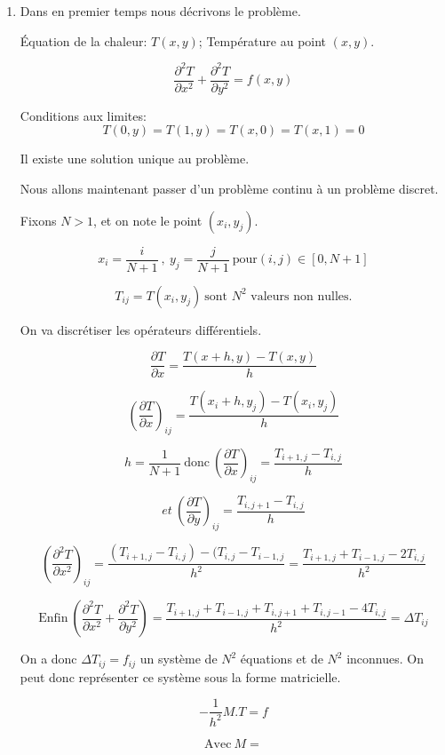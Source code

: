 \documentclass{article}
\begin{document}
\begin{enumerate}
\item Dans en premier temps nous décrivons le problème.

Équation de la chaleur: $T(x,y)$; Température au point $(x,y)$.

\[\frac{\partial^2T}{\partial x^2} + \frac{\partial^2T}{\partial y^2} = f(x,y)\]

Conditions aux limites:
\[T(0,y) = T(1,y) = T(x,0) = T(x,1) = 0\]

Il existe une solution unique au problème.

Nous allons maintenant passer d'un problème continu à un problème discret.

Fixons $N>1$, et on note le point $(x_i,y_j)$.

\[x_i = \frac{i}{N+1}\ ,\ y_j = \frac{j}{N+1}\ \text{pour} (i,j) \in [0,N+1]\]

\[T_{ij} = T(x_i,y_j)\ \text{sont $N^2$ valeurs non nulles.}\]

On va discrétiser les opérateurs différentiels.

\[\frac{\partial T}{\partial x} = \frac{T(x+h,y) - T(x,y)}{h}\]

\[\left(\frac{\partial T}{\partial x}\right)_{ij} = \frac{T(x_i+h,y_j) - T(x_i,y_j)}{h}\]

\[h = \frac{1}{N+1}\ \text{donc}\ \left(\frac{\partial T}{\partial x}\right)_{ij} = \frac{T_{i+1,j} - T_{i,j}}{h}\]

\[et\ \left(\frac{\partial T}{\partial y}\right)_{ij} = \frac{T_{i,j+1} - T_{i,j}}{h}\]

\[\left(\frac{\partial ^2T}{\partial x^2}\right)_{ij} = \frac{(T_{i+1,j} - T_{i,j})-(T_{i,j} - T_{i-1,j}}{h^2} = \frac{T_{i+1,j} + T_{i-1,j} - 2T_{i,j}}{h^2}\]

\[\text{Enfin}\ \left(\frac{\partial ^2T}{\partial x^2} + \frac{\partial ^2T}{\partial y^2}\right) = \frac{T_{i+1,j} + T_{i-1,j} + T_{i,j+1} + T_{i,j-1} - 4T_{i,j}}{h^2} = \Delta T_{ij}\]

On a donc $\Delta T_{ij} = f_{ij}$ un système de $N^2$ équations et de $N^2$ inconnues. On peut donc représenter ce système sous la forme matricielle.

\[-\frac{1}{h^2}M.T = f\]

\[\text{Avec}\ M = \]


\end{enumerate}
\end{document}
